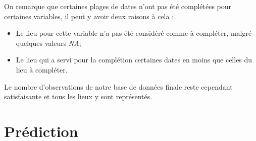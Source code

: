 \documentclass{article}
\begin{document}
On remarque que certaines plages de dates n'ont pas été complétées pour certaines variables, il peut y avoir deux raisons à cela : 
\begin{itemize}
    \item Le lieu pour cette variable n'a pas été considéré comme à compléter, malgré quelques valeurs \emph{NA};
    \item Le lieu qui a servi pour la complétion certaines dates en moins que celles du lieu à compléter.
\end{itemize}
Le nombre d'observations de notre base de données finale reste cependant satisfaisante et tous les lieux y sont représentés.

\section{Prédiction}

\newpage
\printbibliography
\end{document}
